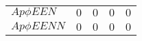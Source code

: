 \begin{center}
\begin{table}[H]
\begin{tabular}{|l|l|l|l|l|}
            $Ap\phi EEN$  & $0$                     & $0$                                                                                           & $0$                              & $0$                                  \\
            $Ap\phi EENN$ & $0$                     & $0$                                                                                           & $0$                              & $0$                                  \\
            \hline
        \end{tabular}
        \label{tab:Ap_coefficients}
    \end{table}
\end{center}

\eject
\restoregeometry
\pdfpagewidth=210mm
\pdfpageheight=297mm
